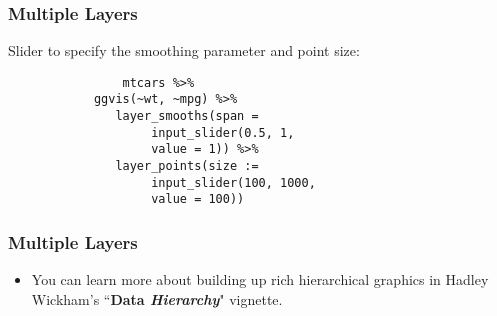 \documentclass[MASTER.tex]{subfiles}
\begin{document}
\begin{frame}[fragile]
	\frametitle{Multiple Layers}
	\Large
	Slider to specify the smoothing parameter and point size:
	\vspace{-0.2cm}
	\begin{framed}
		\begin{verbatim}
				mtcars %>%
		    ggvis(~wt, ~mpg) %>%
		       layer_smooths(span = 
		            input_slider(0.5, 1, 
		            value = 1)) %>%
		       layer_points(size := 
		            input_slider(100, 1000, 
		            value = 100))
		\end{verbatim}
		\end{framed}
\end{frame}
\begin{frame}[fragile]
\frametitle{Multiple Layers}
	\Large
	\vspace{-2.5cm}
\begin{itemize}
\item You can learn more about building up rich hierarchical graphics in Hadley Wickham's ``\textbf{Data \textit{Hierarchy}}" vignette.
\end{itemize}


\end{frame}
\end{document}
